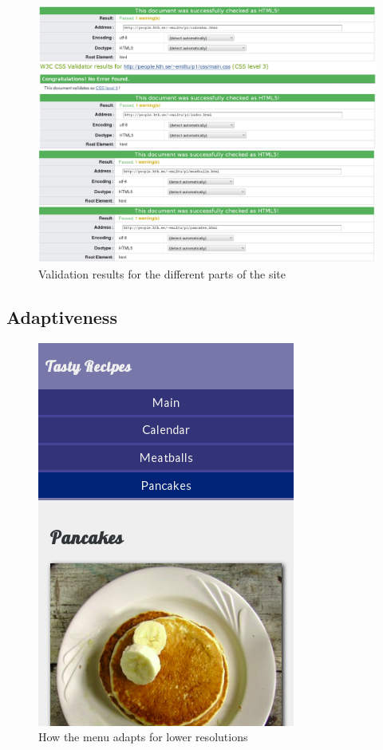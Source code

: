 \documentclass[a4paper]{scrartcl}
\begin{document}
\begin{figure}[!h]
  \begin{center}
    \includegraphics[scale=0.3]{valid.png}
    \caption{Validation results for the different parts of the site}
    \label{fig:valid}
  \end{center}
\end{figure}

\subsection{Adaptiveness}

\begin{figure}[!h]
  \begin{center}
    \includegraphics[scale=0.3]{pancakelow1.png}
    \caption{How the menu adapts for lower resolutions}
    \label{fig:menu-adapt}
  \end{center}
\end{figure}
\end{document}
